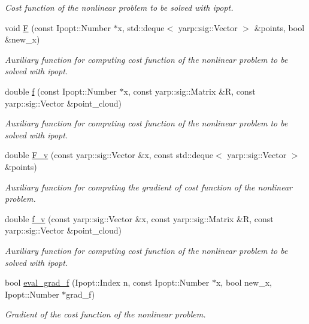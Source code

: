 \begin{DoxyCompactItemize}
\begin{DoxyCompactList}\small\item\em Cost function of the nonlinear problem to be solved with ipopt. \end{DoxyCompactList}\item 
void \mbox{\hyperlink{classSuperQuadric__NLP_afaecc87e024a55c07d13f45b8e7af173}{F}} (const Ipopt\+::\+Number $\ast$x, std\+::deque$<$ yarp\+::sig\+::\+Vector $>$ \&points, bool \&new\+\_\+x)
\begin{DoxyCompactList}\small\item\em Auxiliary function for computing cost function of the nonlinear problem to be solved with ipopt. \end{DoxyCompactList}\item 
double \mbox{\hyperlink{classSuperQuadric__NLP_aa914a977bcaea04f375778085c40cb9a}{f}} (const Ipopt\+::\+Number $\ast$x, const yarp\+::sig\+::\+Matrix \&R, const yarp\+::sig\+::\+Vector \&point\+\_\+cloud)
\begin{DoxyCompactList}\small\item\em Auxiliary function for computing cost function of the nonlinear problem to be solved with ipopt. \end{DoxyCompactList}\item 
double \mbox{\hyperlink{classSuperQuadric__NLP_adc57687952c43086dff7b2da7c3456a8}{F\+\_\+v}} (const yarp\+::sig\+::\+Vector \&x, const std\+::deque$<$ yarp\+::sig\+::\+Vector $>$ \&points)
\begin{DoxyCompactList}\small\item\em Auxiliary function for computing the gradient of cost function of the nonlinear problem. \end{DoxyCompactList}\item 
double \mbox{\hyperlink{classSuperQuadric__NLP_a36f02b201ae96896b9627851199eb49c}{f\+\_\+v}} (const yarp\+::sig\+::\+Vector \&x, const yarp\+::sig\+::\+Matrix \&R, const yarp\+::sig\+::\+Vector \&point\+\_\+cloud)
\begin{DoxyCompactList}\small\item\em Auxiliary function for computing cost function of the nonlinear problem to be solved with ipopt. \end{DoxyCompactList}\item 
bool \mbox{\hyperlink{classSuperQuadric__NLP_a7ad18ed5adb66e686409183651de562c}{eval\+\_\+grad\+\_\+f}} (Ipopt\+::\+Index n, const Ipopt\+::\+Number $\ast$x, bool new\+\_\+x, Ipopt\+::\+Number $\ast$grad\+\_\+f)
\begin{DoxyCompactList}\small\item\em Gradient of the cost function of the nonlinear problem. \end{DoxyCompactList}\item 

\end{DoxyCompactItemize}
